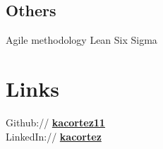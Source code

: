 \documentclass[top=0in]{deedy-resume-openfont}
\begin{document}
\begin{minipage}[t]{0.33\textwidth}
\subsection{Others}
Agile methodology 
\textbullet{} Lean Six Sigma 
\sectionsep


\section{Links} 
Github:// \href{https://github.com/kacortez11}{\bf kacortez11} \\
LinkedIn://  \href{https://www.linkedin.com/in/kacortez}{\bf kacortez} \\




%
%

\end{minipage}
\end{document}
